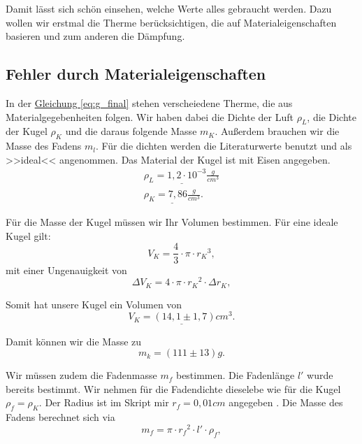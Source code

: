 Damit lässt sich schön einsehen, welche Werte alles gebraucht werden. Dazu wollen wir erstmal die Therme berücksichtigen, die auf Materialeigenschaften basieren und zum anderen die Dämpfung. 

\subsection{Fehler durch Materialeigenschaften}
In der \hyperref[eq:g_final]{Gleichung \ref*{eq:g_final}} stehen verscheiedene Therme, die aus Materialgegebenheiten folgen. Wir haben dabei die Dichte der Luft $\rho_L$, die Dichte der Kugel $\rho_K$ und die daraus folgende Masse $m_K$. Außerdem brauchen wir die Masse des Fadens $m_l$. Für die dichten werden die Literaturwerte benutzt und als >>ideal<< angenommen. Das Material der Kugel ist mit Eisen angegeben.
\begin{align}
    \underline{\rho_L = 1,2 \cdot 10^{-3} \frac{g}{cm^3}} \\
    \underline{\rho_K = 7,86 \frac{g}{cm^3}}.
\end{align}

Für die Masse der Kugel müssen wir Ihr Volumen bestimmen. Für eine ideale Kugel gilt:
\begin{equation}
    V_K = \frac{4}{3} \cdot \pi \cdot {r_K}^3,
\end{equation}
mit einer Ungenauigkeit von
\begin{equation}
    \Delta V_K = 4 \cdot \pi \cdot {r_K}^2 \cdot \Delta r_K,
\end{equation}

Somit hat unsere Kugel ein Volumen von
\begin{equation}
    \underline{
        V_K = (14,1 \pm 1,7) cm^3.
    }
\end{equation}

Damit können wir die Masse zu 
\begin{equation}
    \boxed{
        m_k = (111 \pm 13) g.
    }
\end{equation}

Wir müssen zudem die Fadenmasse $m_f$ bestimmen. Die Fadenlänge $l'$ wurde bereits bestimmt. Wir nehmen für die Fadendichte dieselebe wie für die Kugel $\rho_f = \rho_K$. Der Radius ist im Skript mir $r_f = 0,01cm$ angegeben \cite{skript25}.
Die Masse des Fadens berechnet sich via
\begin{equation}
    m_f = \pi \cdot {r_f}^2 \cdot l' \cdot \rho_f,
\end{equation}

